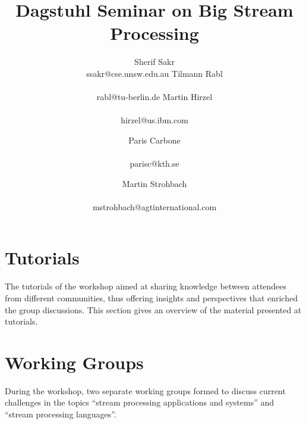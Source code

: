\documentclass[preprint]{sig-alternate-10pt}
\begin{document}
\title{Dagstuhl Seminar on Big Stream Processing}

\newcommand*{\emailn}[1]{\textsf{\normalsize #1}}

\author{
\alignauthor
Sherif Sakr\\
  \emailn{ssakr@cse.unsw.edu.au}
\alignauthor
Tilmann Rabl\\
  \\
  \emailn{rabl@tu-berlin.de}
\alignauthor
Martin Hirzel\\
  \\
  \emailn{hirzel@us.ibm.com}
\and
\alignauthor
Paris Carbone\\
  \\
  \emailn{parisc@kth.se}
\and
\alignauthor
Martin Strohbach\\
  \\
  \emailn{mstrohbach@agtinternational.com}}


\maketitle



\section{Tutorials}
The tutorials of the workshop aimed at sharing knowledge between
attendees from different communities, thus offering insights and
perspectives that enriched the group discussions. This section gives
an overview of the material presented at tutorials.




\section{Working Groups}
During the workshop, two separate working groups formed to discuss
current challenges in the topics ``stream processing applications and systems''
and ``stream processing languages''.






\balance

\end{document}
